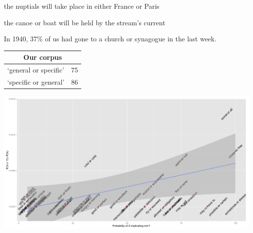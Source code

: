 \documentclass[landscape,a0paper,fontscale=0.292]{baposter}
\renewcommand{\highlight}[1]{{\color{highlightcolor}#1}}
\begin{document}
\begin{poster}
{  \begin{minipage}[c]{0.48\linewidth}
    \begin{examples}\setlength{\itemsep}{0pt}
    \item the nuptials will take place in either \highlight{France or
        Paris}
    \item the \highlight{canoe or boat} will be held by the stream's
      current
    \item In 1940, 37\% of us had gone to a \highlight{church or
        synagogue} in the last week.
    \end{examples}

    \begin{center}
      \begin{tabular}[c]{r l}
        \toprule
        \multicolumn{2}{c}{\textbf{Our corpus}} \\
        \midrule
        `general or specific' & 75 \\
        `specific or general' & 86 \\
        \bottomrule
      \end{tabular}
    \end{center}       
  \end{minipage}
\hfill 
\begin{minipage}[c]{0.48\linewidth}  
  \includegraphics[width=1\textwidth]{../fig/chemla.pdf}


\end{minipage}}
\end{poster}
\end{document}
